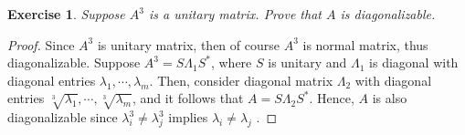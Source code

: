 \documentclass[10pt]{book}
\newtheorem{exercise}{Exercise}[section]
\theoremstyle{definition}
\numberwithin{equation}{chapter}
\begin{document}
\medskip

\begin{exercise}{\bf *}
Suppose $A^3$ is a unitary matrix. Prove that $A$ is diagonalizable.
\end{exercise}
\begin{proof}
Since $A^3$ is unitary matrix, then of course $A^3$ is normal matrix, thus diagonalizable. Suppose $A^3 = S \Lambda_1 S^*$, where $S$ is unitary and $\Lambda_1$ is diagonal with diagonal entries $\lambda_1, \cdots, \lambda_m$. Then, consider diagonal matrix $\Lambda_2$ with diagonal entries $\sqrt[3]{\lambda_1}, \cdots, \sqrt[3]{\lambda_m}$, and it follows that $A = S \Lambda_2 S^*$. Hence, $A$ is also diagonalizable since $\lambda_i^3 \neq \lambda_j^3$ implies $\lambda_i \neq \lambda_j$ \cite{22}.
\end{proof}

\medskip
\end{document}
